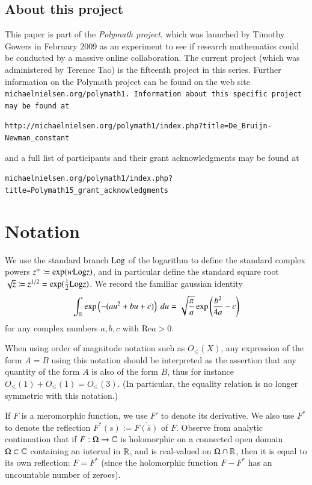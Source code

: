 \subsection{About this project}

This paper is part of the \emph{Polymath project}, which was launched
by Timothy Gowers in February 2009 as an experiment to see if research
mathematics could be conducted by a massive online collaboration.
The current project (which was administered by Terence Tao) is the fifteenth
project in this series.  Further information on the Polymath project can be
found on the web site \tt{michaelnielsen.org/polymath1}.  Information
about this specific project may be found at
\begin{center}
\small{\tt{http://michaelnielsen.org/polymath1/index.php?title=De\_Bruijn-Newman\_constant}}
\end{center}
and a full list of participants and their grant acknowledgments may be
found at
\begin{center}
\small{\tt{michaelnielsen.org/polymath1/index.php?title=Polymath15\_grant\_acknowledgments}}
\end{center}

\section{Notation}

We use the standard branch ${\operatorname{Log}}$ of the logarithm to define the standard complex powers $z^w \coloneqq \exp( w {\operatorname{Log}} z)$, and in particular define the standard square root $\sqrt{z} \coloneqq z^{1/2} = \exp( \frac{1}{2} {\operatorname{Log}} z)$.  We record the familiar gaussian identity
\begin{equation}\label{gaussian}
 \int_{\mathbb{R}} \exp\left(-(au^2+bu+c)\right)\ du = \sqrt{\frac{\pi}{a}} \exp\left( \frac{b^2}{4a} - c\right)
\end{equation}
for any complex numbers $a,b,c$ with $\mathrm{Re} a > 0$.

When using order of magnitude notation such as $O_{\leq}(X)$, any expression of the form $A=B$ using this notation should be interpreted as the assertion that any quantity of the form $A$ is also of the form $B$, thus for instance $O_{\leq}(1) + O_{\leq}(1) = O_{\leq}(3)$.  (In particular, the equality relation is no longer symmetric with this notation.)

If $F$ is a meromorphic function, we use $F'$ to denote its derivative.  We also use $F^*$ to denote the reflection $F^*(s) := \overline{F(\overline{s})}$ of $F$.  Observe from analytic continuation that if $F:\Omega \to \mathbb{C}$ is holomorphic on a connected open domain $\Omega \subset \mathbb{C}$ containing an interval in $\mathbb{R}$, and is real-valued on $\Omega \cap \mathbb{R}$, then it is equal to its own reflection: $F = F^*$ (since the holomorphic function $F - F^*$ has an uncountable number of zeroes).

